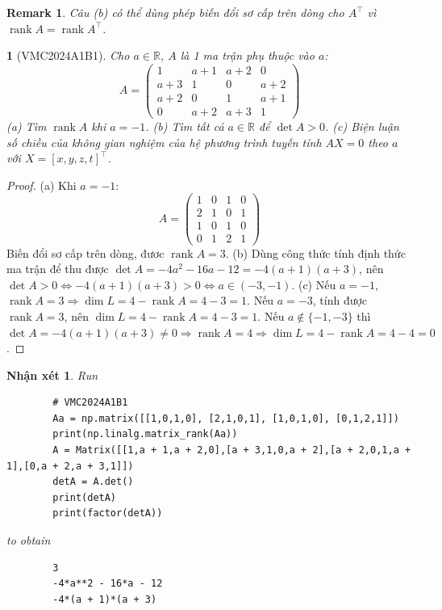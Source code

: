 \documentclass{article}
\newtheorem{baitoan}{}
\newtheorem{nhanxet}{Nhận xét}
\newtheorem{remark}{Remark}
\begin{document}
\begin{remark}
	Câu (b) có thể dùng phép biến đổi sơ cấp trên dòng cho $A^\top$ vì $\operatorname{rank}A = \operatorname{rank}A^\top$.
\end{remark}

\begin{baitoan}[VMC2024A1B1]
	Cho $a\in\mathbb{R}$, $A$ là 1 ma trận phụ thuộc vào $a$:
	\begin{equation}
		A = \begin{pmatrix}
			1 & a + 1 & a + 2 & 0\\a + 3 & 1 & 0 & a + 2\\a + 2 & 0 & 1 & a + 1\\0 & a + 2 & a + 3 & 1
		\end{pmatrix}
	\end{equation}
	(a) Tìm $\operatorname{rank}A$ khi $a = -1$. (b) Tìm tất cả $a\in\mathbb{R}$ để $\det A > 0$. (c) Biện luận số chiều của không gian nghiệm của hệ phương trình tuyến tính $AX = 0 $ theo $a$ với $X = [x,y,z,t]^\top$.
\end{baitoan}

\begin{proof}
	(a) Khi $a = -1$:
	\begin{equation}
		A = \begin{pmatrix}
			1 & 0 & 1 & 0\\2 & 1 & 0 & 1\\1 & 0 & 1 & 0\\0 &1 & 2 & 1
		\end{pmatrix}
	\end{equation}
	Biến đổi sơ cấp trên dòng, đươc $\operatorname{rank}A = 3$. (b) Dùng công thức tính định thức ma trận để thu được $\det A = -4a^2 - 16a - 12 = -4(a + 1)(a + 3)$, nên $\det A > 0\Leftrightarrow-4(a + 1)(a + 3) > 0\Leftrightarrow a\in(-3,-1)$. (c) Nếu $a = -1$, $\operatorname{rank}A = 3\Rightarrow\dim L = 4 - \operatorname{rank}A = 4 - 3 = 1$. Nếu $a = -3$, tính được $\operatorname{rank}A = 3$, nên $\dim L = 4 - \operatorname{rank}A = 4 - 3 = 1$. Nếu $a\notin\{-1,-3\}$ thì $\det A = -4(a + 1)(a + 3)\ne0\Rightarrow\operatorname{rank}A = 4\Rightarrow\dim L = 4 - \operatorname{rank}A = 4 - 4 = 0$.	
\end{proof}

\begin{nhanxet}
	Run
	\begin{verbatim}
		# VMC2024A1B1
		Aa = np.matrix([[1,0,1,0], [2,1,0,1], [1,0,1,0], [0,1,2,1]])
		print(np.linalg.matrix_rank(Aa))
		A = Matrix([[1,a + 1,a + 2,0],[a + 3,1,0,a + 2],[a + 2,0,1,a + 1],[0,a + 2,a + 3,1]])
		detA = A.det()
		print(detA)
		print(factor(detA))
	\end{verbatim}
	to obtain
	\begin{verbatim}
		3
		-4*a**2 - 16*a - 12
		-4*(a + 1)*(a + 3)
	\end{verbatim}
\end{nhanxet}
\end{document}
